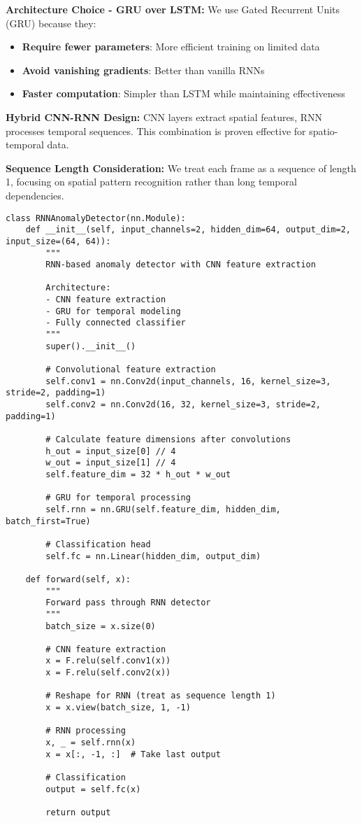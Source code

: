\documentclass[12pt,a4paper]{article}
\begin{document}
\textbf{Architecture Choice - GRU over LSTM:} We use Gated Recurrent Units (GRU) because they:
\begin{itemize}
    \item \textbf{Require fewer parameters}: More efficient training on limited data
    \item \textbf{Avoid vanishing gradients}: Better than vanilla RNNs
    \item \textbf{Faster computation}: Simpler than LSTM while maintaining effectiveness
\end{itemize}

\textbf{Hybrid CNN-RNN Design:} CNN layers extract spatial features, RNN processes temporal sequences. This combination is proven effective for spatio-temporal data.

\textbf{Sequence Length Consideration:} We treat each frame as a sequence of length 1, focusing on spatial pattern recognition rather than long temporal dependencies.

\begin{lstlisting}[caption={RNN Anomaly Detector - Sequential Pattern Recognition}]
class RNNAnomalyDetector(nn.Module):
    def __init__(self, input_channels=2, hidden_dim=64, output_dim=2, input_size=(64, 64)):
        """
        RNN-based anomaly detector with CNN feature extraction

        Architecture:
        - CNN feature extraction
        - GRU for temporal modeling
        - Fully connected classifier
        """
        super().__init__()

        # Convolutional feature extraction
        self.conv1 = nn.Conv2d(input_channels, 16, kernel_size=3, stride=2, padding=1)
        self.conv2 = nn.Conv2d(16, 32, kernel_size=3, stride=2, padding=1)

        # Calculate feature dimensions after convolutions
        h_out = input_size[0] // 4
        w_out = input_size[1] // 4
        self.feature_dim = 32 * h_out * w_out

        # GRU for temporal processing
        self.rnn = nn.GRU(self.feature_dim, hidden_dim, batch_first=True)

        # Classification head
        self.fc = nn.Linear(hidden_dim, output_dim)

    def forward(self, x):
        """
        Forward pass through RNN detector
        """
        batch_size = x.size(0)

        # CNN feature extraction
        x = F.relu(self.conv1(x))
        x = F.relu(self.conv2(x))

        # Reshape for RNN (treat as sequence length 1)
        x = x.view(batch_size, 1, -1)

        # RNN processing
        x, _ = self.rnn(x)
        x = x[:, -1, :]  # Take last output

        # Classification
        output = self.fc(x)

        return output
\end{lstlisting}
\end{document}
